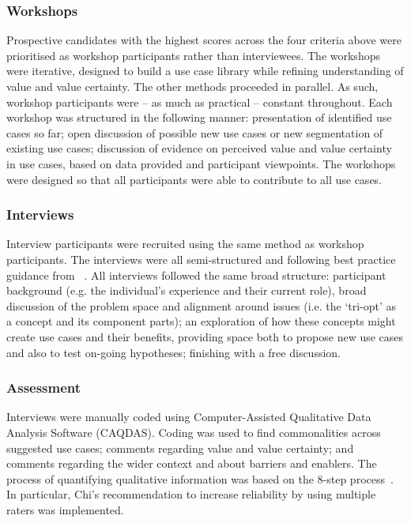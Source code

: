 \documentclass[b5paper,10pt]{article}
\begin{document}
\subsubsection{Workshops}

Prospective candidates with the highest scores across the four
criteria above were prioritised as workshop participants rather than
interviewees. The workshops were iterative, designed to build a use
case library while refining understanding of value and value
certainty. The other methods proceeded in parallel. As such, workshop
participants were -- as much as practical -- constant throughout.
Each workshop was structured in the following manner: presentation of
identified use cases so far; open discussion of possible new use cases
or new segmentation of existing use cases; discussion of evidence on
perceived value and value certainty in use cases, based on data
provided and participant viewpoints. The workshops were designed so
that all participants were able to contribute to all use cases.

\subsubsection{Interviews}

Interview participants were recruited using the same method as
workshop participants. The interviews were all semi-structured and
following best practice guidance from ~\citet{king+horrocks:2010}. All
interviews followed the same broad structure: participant background
(e.g. the individual's experience and their current role), broad
discussion of the problem space and alignment around issues (i.e. the
`tri-opt' as a concept and its component parts); an exploration of how
these concepts might create use cases and their benefits, providing
space both to propose new use cases and also to test on-going
hypotheses; finishing with a free discussion.

\subsubsection{Assessment}

Interviews were manually coded using Computer-Assisted Qualitative
Data Analysis Software (CAQDAS). Coding was used to find commonalities
across suggested use cases; comments regarding value and value
certainty; and comments regarding the wider context and about barriers
and enablers. The process of quantifying qualitative information was
based on the 8-step process~\citep{chi:1997}. In particular, Chi's
recommendation to increase reliability by using multiple raters was
implemented.
\end{document}
